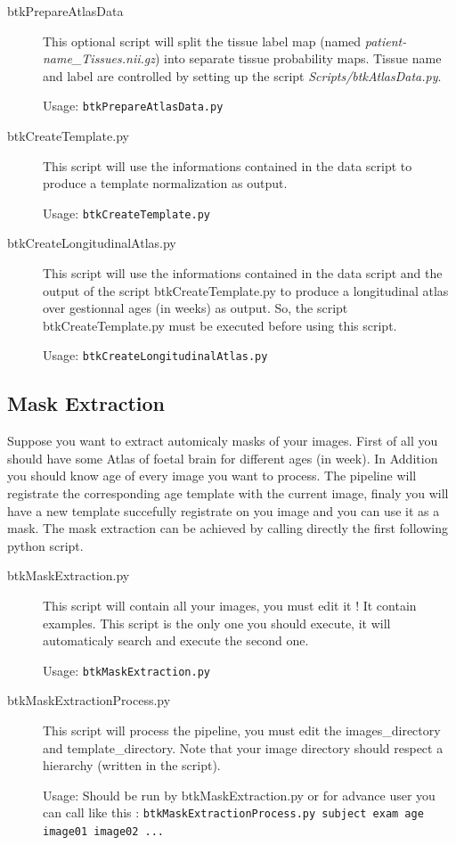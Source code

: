     \begin{description}
        \item[btkPrepareAtlasData] This optional script will split the tissue label map (named \emph{patient-name\_Tissues.nii.gz}) into separate tissue probability maps. Tissue name and label are controlled by setting up the script \emph{Scripts/btkAtlasData.py}.

        Usage: \texttt{btkPrepareAtlasData.py}

        \item[btkCreateTemplate.py] This script will use the informations contained in the data script to produce a template normalization as output.

        Usage: \texttt{btkCreateTemplate.py}

        \item[btkCreateLongitudinalAtlas.py] This script will use the informations contained in the data script and the output of the script btkCreateTemplate.py to produce a longitudinal atlas over gestionnal ages (in weeks) as output. So, the script btkCreateTemplate.py must be executed before using this script.

        Usage: \texttt{btkCreateLongitudinalAtlas.py}
    \end{description}

\subsection{Mask Extraction}
\label{subsec:Mask}

Suppose you want to extract automicaly masks of your images. First of all you should have some Atlas of foetal brain for different ages (in week).
In Addition you should know age of every image you want to process.
The pipeline will registrate the corresponding age template with the current image, finaly you will have a new template succefully registrate on you image and you can use it as a mask.
The mask extraction can be achieved by calling directly the first following python script.
    \begin{description}
        \item[btkMaskExtraction.py] This script will contain all your images, you must edit it ! It contain examples. This script is the only one you should execute, it will automaticaly search and execute the second one.

        Usage: \texttt{btkMaskExtraction.py}

        \item[btkMaskExtractionProcess.py] This script will process the pipeline, you must edit the images\_directory and template\_directory. Note that your image directory should respect a hierarchy (written in the script).

        Usage: Should be run by btkMaskExtraction.py or for advance user you can call like this : \texttt{btkMaskExtractionProcess.py subject exam age image01 image02 ...}
    \end{description}

